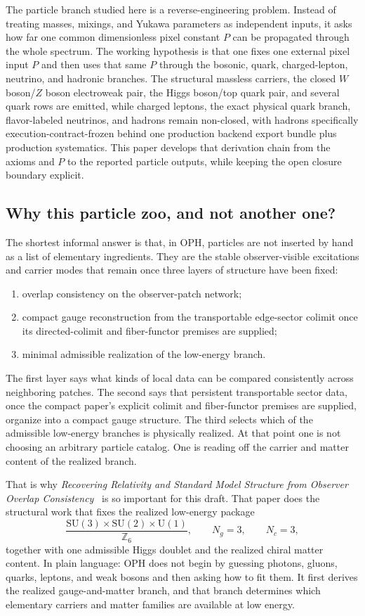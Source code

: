 \documentclass[11pt]{article}
\newcommand{\SU}{\mathrm{SU}}
\newcommand{\U}{\mathrm{U}}
\begin{document}
The particle branch studied here is a reverse-engineering problem. Instead of treating masses,
mixings, and Yukawa parameters as independent inputs, it asks how far one common dimensionless
pixel constant \(P\) can be propagated through the whole spectrum. The working hypothesis is that
one fixes one external pixel input \(P\) and then uses that same \(P\)
through the bosonic, quark, charged-lepton, neutrino, and hadronic branches. The structural
massless carriers, the closed \(W\) boson/\(Z\) boson electroweak pair, the Higgs boson/top quark pair,
and several quark rows are emitted, while charged leptons, the exact physical quark branch, flavor-labeled neutrinos, and
hadrons remain non-closed, with hadrons specifically execution-contract-frozen behind one production backend export bundle plus production systematics. This paper develops that derivation chain from the axioms and \(P\) to the
reported particle outputs, while keeping the open closure boundary explicit.

\subsection{Why this particle zoo, and not another one?}

The shortest informal answer is that, in OPH, particles are not inserted by hand as a list of
elementary ingredients. They are the stable observer-visible excitations and carrier modes that
remain once three layers of structure have been fixed:
\begin{enumerate}[leftmargin=2em]
\item overlap consistency on the observer-patch network;
\item compact gauge reconstruction from the transportable edge-sector colimit once its directed-colimit and fiber-functor premises are supplied;
\item minimal admissible realization of the low-energy branch.
\end{enumerate}
The first layer says what kinds of local data can be compared consistently across neighboring
patches. The second says that persistent transportable sector data, once the compact paper's
explicit colimit and fiber-functor premises are supplied, organize into a compact gauge
structure. The third selects which of the admissible low-energy branches is physically realized.
At that point one is not choosing an arbitrary particle catalog. One is reading off the
carrier and matter content of the realized branch.

That is why \emph{Recovering Relativity and Standard Model Structure from Observer Overlap Consistency}~\cite{ophcompact} is so important for this draft. That paper does
the structural work that fixes the realized low-energy package
\[
\frac{\SU(3)\times\SU(2)\times\U(1)}{\mathbb Z_6},
\qquad
N_g=3,
\qquad
N_c=3,
\]
together with one admissible Higgs doublet and the realized chiral matter content. In plain
language: OPH does not begin by guessing photons, gluons, quarks, leptons, and weak bosons and
then asking how to fit them. It first derives the realized gauge-and-matter branch, and that
branch determines which elementary carriers and matter families are available at low energy.
\end{document}

